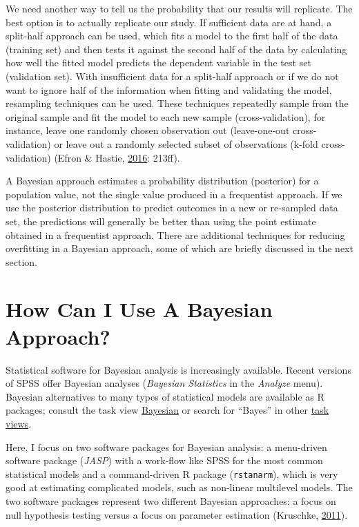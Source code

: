 \documentclass[doc]{apa6}
\begin{document}
We need another way to tell us the probability that our results will
replicate. The best option is to actually replicate our study. If
sufficient data are at hand, a split-half approach can be used, which
fits a model to the first half of the data (training set) and then tests
it against the second half of the data by calculating how well the
fitted model predicts the dependent variable in the test set (validation
set). With insufficient data for a split-half approach or if we do not
want to ignore half of the information when fitting and validating the
model, resampling techniques can be used. These techniques repeatedly
sample from the original sample and fit the model to each new sample
(cross-validation), for instance, leave one randomly chosen observation
out (leave-one-out cross-validation) or leave out a randomly selected
subset of observations (k-fold cross-validation) (Efron \& Hastie,
\protect\hyperlink{ref-efronComputerAgeStatistical2016}{2016}: 213ff).

A Bayesian approach estimates a probability distribution (posterior) for
a population value, not the single value produced in a frequentist
approach. If we use the posterior distribution to predict outcomes in a
new or re-sampled data set, the predictions will generally be better
than using the point estimate obtained in a frequentist approach. There
are additional techniques for reducing overfitting in a Bayesian
approach, some of which are briefly discussed in the next section.

\section{How Can I Use A Bayesian Approach?}\label{usebayesian}

Statistical software for Bayesian analysis is increasingly available.
Recent versions of SPSS offer Bayesian analyses (\emph{Bayesian
Statistics} in the \emph{Analyze} menu). Bayesian alternatives to many
types of statistical models are available as R packages; consult the
task view
\href{https://cran.r-project.org/web/views/Bayesian.html}{Bayesian} or
search for \enquote{Bayes} in other
\href{https://cran.r-project.org/web/views/}{task views}.

Here, I focus on two software packages for Bayesian analysis: a
menu-driven software package (\emph{JASP}) with a work-flow like SPSS
for the most common statistical models and a command-driven R package
(\texttt{rstanarm}), which is very good at estimating complicated
models, such as non-linear multilevel models. The two software packages
represent two different Bayesian approaches: a focus on null hypothesis
testing versus a focus on parameter estimation (Kruschke,
\protect\hyperlink{ref-kruschkeBayesianAssessmentNull2011}{2011}).
\end{document}
